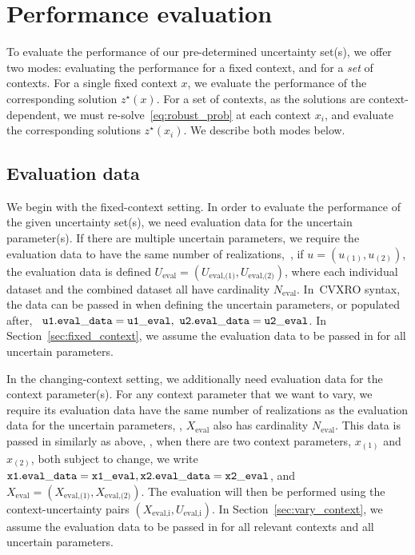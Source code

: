 \section{Performance evaluation}
\label{sec:eval_sol}
To evaluate the performance of our pre-determined uncertainty set(s), we offer two modes: evaluating the performance for a fixed context, and for a {\it set} of contexts. For a single fixed context $x$, we evaluate the performance of the corresponding solution $z^\star(x)$. For a set of contexts, as the solutions are context-dependent, we must re-solve~\eqref{eq:robust_prob} at each context $x_i$, and evaluate the corresponding solutions $z^\star(x_i)$.
We describe both modes below. 

\subsection{Evaluation data}
\label{sec:eval_data}
We begin with the fixed-context setting. 
In order to evaluate the performance of the given uncertainty set(s), we need evaluation data for the uncertain parameter(s). If there are multiple uncertain parameters, we require the evaluation data to have the same number of realizations,~\ie, if $u = (u_{(1)},u_{(2)})$, the evaluation data is defined
$U_\text{eval} = (U_\text{eval,{(1)}}, U_\text{eval,{(2)}})$, where each individual dataset and the combined dataset all have cardinality $N_{\text{eval}}$. In~\gls{CVXRO} syntax, the data can be passed in when defining the uncertain parameters, or populated after, \eg~$\tt{u1.eval\_data = u1\_eval},~\tt{u2.eval\_data = u2\_eval}$.
In Section~\ref{sec:fixed_context}, we assume the evaluation data to be passed in for all uncertain parameters.

In the changing-context setting, we additionally need evaluation data for the context parameter(s). For any context parameter that we want to vary, we require its evaluation data have the same number of realizations as the evaluation data for the uncertain parameters, \ie, $X_{\text{eval}}$ also has cardinality $N_{\text{eval}}$. This data is passed in similarly as above, \eg, when there are two context parameters, $x_{(1)}$ and $x_{(2)}$, both subject to change, we write~$\tt{x1.eval\_data = x1\_eval},\tt{x2.eval\_data = x2\_eval}$, and $X_\text{eval} = (X_\text{eval,{(1)}}, X_\text{eval,{(2)}})$. The evaluation will then be performed using the context-uncertainty pairs $(X_\text{eval,i}, U_\text{eval,i})$. In Section~\ref{sec:vary_context}, we assume the evaluation data to be passed in for all relevant contexts and all uncertain parameters.

